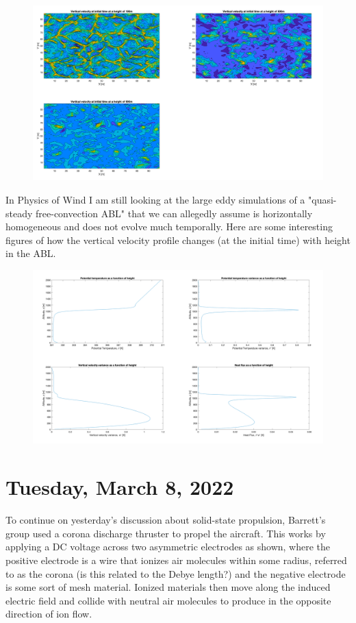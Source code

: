 \documentclass[12pt]{article}
\begin{document}
\begin{figure}[h]
\centering
\includegraphics[width=\linewidth]{images/vertical_velocity_contour.pdf}
\end{figure}

\par
In Physics of Wind I am still looking at the large eddy simulations of a "quasi-steady free-convection ABL" that we can allegedly assume is horizontally homogeneous and does not evolve much temporally. Here are some interesting figures of how the vertical velocity profile changes (at the initial time) with height in the ABL.

\begin{figure}[h]
\centering
\includegraphics[width=\linewidth]{images/ABL_Vertical_Profiles.pdf}
\end{figure}



\section{Tuesday, March 8, 2022}
\par
To continue on yesterday’s discussion about solid-state propulsion, Barrett’s group used a corona discharge thruster to propel the aircraft. This works by applying a DC voltage across two asymmetric electrodes as shown, where the positive electrode is a wire that ionizes air molecules within some radius, referred to as the corona (is this related to the Debye length?) and the negative electrode is some sort of mesh material. Ionized materials then move along the induced electric field and collide with neutral air molecules to produce in the opposite direction of ion flow. 
\end{document}
